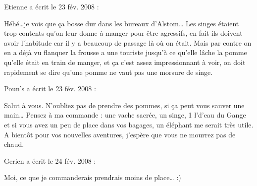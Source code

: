\medskip
Etienne a écrit le 23 fév. 2008 :
\begin{displayquote}
Héhé\dots je vois que ça bosse dur dans les bureaux d'Alstom\dots
Les singes étaient trop contents qu'on leur donne à manger pour être agressifs, en fait ils doivent avoir l'habitude car il y a beaucoup de passage là où on était. Mais par contre on en a déjà vu flanquer la frousse a une touriste jusqu'à ce qu'elle lâche la pomme qu'elle était en train de manger, et ça c'est assez impressionnant à voir, on doit rapidement se dire qu'une pomme ne vaut pas une morsure de singe.
\end{displayquote}

\medskip
Poun's a écrit le 23 fév. 2008 :
\begin{displayquote}
Salut à vous. N'oubliez pas de prendre des pommes, si ça peut vous sauver une main\dots
Pensez à ma commande : une vache sacrée, un singe, 1 l'd'eau du Gange et si vous avez un peu de place dans vos bagages, un éléphant me serait très utile.
A bientôt pour vos nouvelles aventures, j'espère que vous ne mourrez pas de chaud.
\end{displayquote}

\medskip
Gerien a écrit le 24 fév. 2008 :
\begin{displayquote}
Moi, ce que je commanderais prendrais moins de place\dots
:)
\end{displayquote}

\vfill
